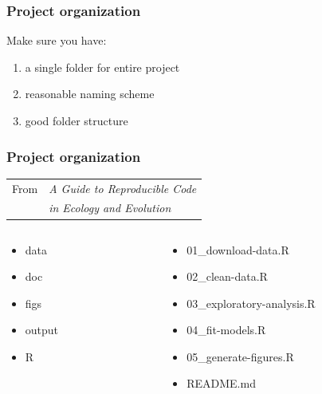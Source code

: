 \documentclass[xcolor=dvipsnames,xcolor=table, 14p]{beamer}
\begin{document}

\begin{frame}\frametitle{Project organization}
    Make sure you have:
    \begin{enumerate}
        \item a single folder for entire project
        \item reasonable naming scheme
        \item good folder structure
    \end{enumerate}
\end{frame}


\begin{frame}\frametitle{Project organization}
    \begin{tabular}{ll}From  & \it A Guide to Reproducible Code\\& \it in Ecology and Evolution\end{tabular}
    \begin{columns}
        \centering
        \begin{column}{0.20\textwidth}
            \begin{itemize}
                \item data
                \item doc
                \item figs
                \item output
                \item R
            \end{itemize}
        \end{column}
        \begin{column}{0.5\textwidth}
            \begin{itemize}
                \item 01\_download-data.R
                \item 02\_clean-data.R
                \item 03\_exploratory-analysis.R
                \item 04\_fit-models.R
                \item 05\_generate-figures.R
                \item README.md
            \end{itemize}
        \end{column}
    \end{columns}
\end{frame}
\end{document}
